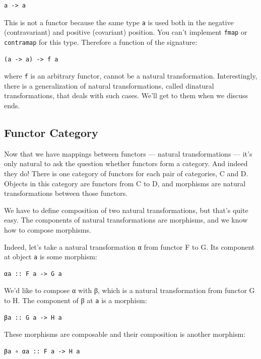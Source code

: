 \begin{verbatim}
a -> a
\end{verbatim}

This is not a functor because the same type \texttt{a} is used both in
the negative (contravariant) and positive (covariant) position. You
can't implement \texttt{fmap} or \texttt{contramap} for this type.
Therefore a function of the signature:

\begin{verbatim}
(a -> a) -> f a
\end{verbatim}

where \texttt{f} is an arbitrary functor, cannot be a natural
transformation. Interestingly, there is a generalization of natural
transformations, called dinatural transformations, that deals with such
cases. We'll get to them when we discuss ends.

\subsection{Functor Category}\label{functor-category}

Now that we have mappings between functors --- natural transformations
--- it's only natural to ask the question whether functors form a
category. And indeed they do! There is one category of functors for each
pair of categories, C and D. Objects in this category are functors from
C to D, and morphisms are natural transformations between those
functors.

We have to define composition of two natural transformations, but that's
quite easy. The components of natural transformations are morphisms, and
we know how to compose morphisms.

Indeed, let's take a natural transformation α from functor F to G. Its
component at object \texttt{a} is some morphism:

\begin{verbatim}
αa :: F a -> G a
\end{verbatim}

We'd like to compose α with β, which is a natural transformation from
functor G to H. The component of β at \texttt{a} is a morphism:

\begin{verbatim}
βa :: G a -> H a
\end{verbatim}

These morphisms are composable and their composition is another
morphism:

\begin{verbatim}
βa ∘ αa :: F a -> H a
\end{verbatim}

